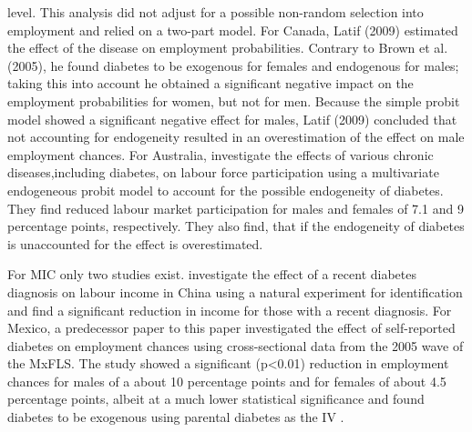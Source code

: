 \documentclass[12pt,english,british]{article}
\begin{document}
level. This analysis did not adjust for a possible non-random selection into employment and relied on a two-part model. 
For Canada, Latif (2009) estimated the effect of the disease on employment probabilities. Contrary to Brown et al. (2005), he found diabetes to be exogenous for females and endogenous for males; taking this into account he obtained a significant negative impact on the employment probabilities for women, but not for men. Because the simple probit model showed a significant negative effect for males, Latif (2009) concluded that not accounting for 
endogeneity resulted in an overestimation of the effect on male employment chances. For Australia, \cite{Zhang2009} investigate the effects of various chronic diseases,including diabetes, on labour force participation using a multivariate endogeneous probit model to account for the possible endogeneity of diabetes. They find reduced labour market participation for males and females of 7.1 and 9 percentage points, respectively. They also find, that if the endogeneity of diabetes is unaccounted for the effect is overestimated. 

For \ac{MIC} only two studies exist. \citet{Liu2014} investigate the effect of a recent diabetes diagnosis on labour income
in China using a natural experiment for identification and find a
significant reduction in income for those with a recent diagnosis.
For Mexico, a predecessor paper to this paper investigated the effect of self-reported
diabetes on employment chances using cross-sectional data from the
2005 wave of the \ac{MxFLS}. The study showed a significant (p<0.01) reduction
in employment chances for males of a about 10 percentage points and
for females of about 4.5 percentage points, albeit at a much lower
statistical significance and found diabetes to be exogenous using parental diabetes as the \ac{IV} \citep{Seuring2015}.
\end{document}
